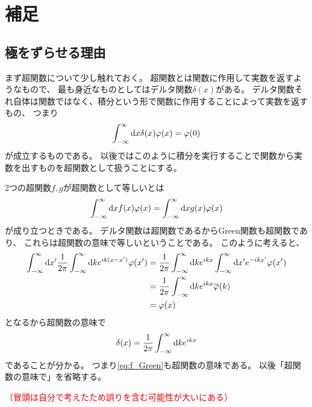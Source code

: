 \documentclass[a4paper, 10pt]{jsarticle}
\theoremstyle{definition}
\newcommand{\ddif}{{\rm d}}
\begin{document}
\section{補足}
\subsection{極をずらせる理由}
まず超関数について少し触れておく。
超関数とは関数に作用して実数を返すようなもので、
最も身近なものとしてはデルタ関数$\delta(x)$がある。
デルタ関数それ自体は関数ではなく、積分という形で関数に作用することによって実数を返すもの、
つまり
\begin{align}
	\int_{-\infty}^{\infty} \ddif x \delta(x) \varphi(x) = \varphi(0)
\end{align}
が成立するものである。
以後ではこのように積分を実行することで関数から実数を出すものを超関数として扱うことにする。

2つの超関数$f, g$が超関数として等しいとは
\begin{align}
	\int_{-\infty}^{\infty} \ddif x f(x) \varphi(x)
	= \int_{-\infty}^{\infty} \ddif x g(x) \varphi(x)
\end{align}
が成り立つときである。
デルタ関数は超関数であるからGreen関数も超関数であり、
これらは超関数の意味で等しいということである。
このように考えると、
\begin{align}
	\int_{-\infty}^{\infty} \ddif x'
	\frac{1}{2\pi} \int_{-\infty}^{\infty} \ddif k e^{ik(x - x')} \varphi(x')
	&= \frac{1}{2\pi} \int_{-\infty}^{\infty}\ddif k e^{ikx}
	\int_{-\infty}^{\infty}\ddif x' e^{-ikx'} \varphi(x') \\
	&= \frac{1}{2\pi} \int_{-\infty}^{\infty} \ddif k
	e^{ikx} \overline{\varphi}(k) \\
	&= \varphi(x)
\end{align}
となるから超関数の意味で
\begin{align}
	\delta(x) = \frac{1}{2\pi} \int_{-\infty}^{\infty} \ddif k e^{ikx}
\end{align}
であることが分かる。
つまり\eqref{eq:f_Green}も超関数の意味である。
以後「超関数の意味で」を省略する。

\noindent
\textcolor{red}{（冒頭は自分で考えたため誤りを含む可能性が大いにある）}
\end{document}
